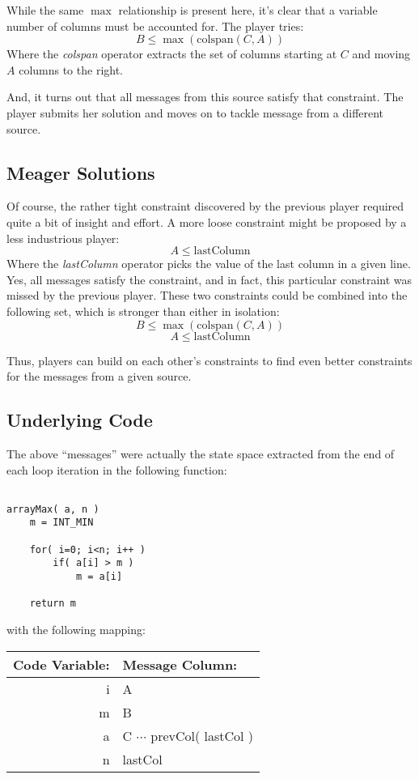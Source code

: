 \documentclass[12pt]{article}
\begin{document}
While the same $\max$ relationship is present here, it's clear that a variable number of columns must be accounted for.  The player tries:
\[
B \leq \max( \mbox{colspan}( C, A ))
\]
Where the {\it colspan} operator extracts the set of columns starting at $C$ and moving $A$ columns to the right.

And, it turns out that all messages from this source satisfy that constraint.  The player submits her solution and moves on to tackle message from a different source.


\subsection{Meager Solutions}
Of course, the rather tight constraint discovered by the previous player required quite a bit of insight and effort.  A more loose constraint might be proposed by a less industrious player:
\[
A \leq \mbox{lastColumn}
\]
Where the {\it lastColumn} operator picks the value of the last column in a given line.  Yes, all messages satisfy the constraint, and in fact, this particular constraint was missed by the previous player.  These two constraints could be combined into the following set, which is stronger than either in isolation:
\[
B \leq \max( \mbox{colspan}( C, A ))
\]
\[
A \leq \mbox{lastColumn}
\]

Thus, players can build on each other's constraints to find even better constraints for the messages from a given source.

\subsection{Underlying Code}

The above ``messages'' were actually the state space extracted from the end of each loop iteration in the following function:

\begin{center}
\begin{BVerbatim}

arrayMax( a, n )
    m = INT_MIN

    for( i=0; i<n; i++ )
        if( a[i] > m )
            m = a[i]
    
    return m

\end{BVerbatim}

\end{center}
with the following mapping:
\begin{center}
\begin{tabular}{|r||l|}
\hline
Code Variable:&Message Column:\\
\hline
\hline
i&A\\
\hline
m&B\\
\hline
a&C $\cdots$ prevCol( lastCol )\\
\hline
n&lastCol\\
\hline
\end{tabular}
\end{center}
\end{document}

